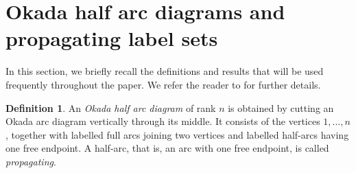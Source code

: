 \documentclass[12pt,reqno]{amsart}
\numberwithin{equation}{section}
\theoremstyle{definition}
\newtheorem{definition}[theorem]{Definition}
\theoremstyle{definition}
\begin{document}
\section{Okada half arc diagrams and propagating label sets}


In this section, we briefly recall the definitions and results that will be used frequently throughout the paper. We refer the reader to \cite{HivertScott} for further details.




\begin{definition}
An \emph{Okada half arc diagram} of rank $n$ is obtained by cutting an
Okada arc diagram vertically through its middle. It consists of the
vertices $1,\ldots,n$, together with labelled full arcs joining two
vertices and labelled half-arcs having one free endpoint. A half-arc, that is, an arc with one free endpoint, is called \emph{propagating}.
\end{definition}
\end{document}
